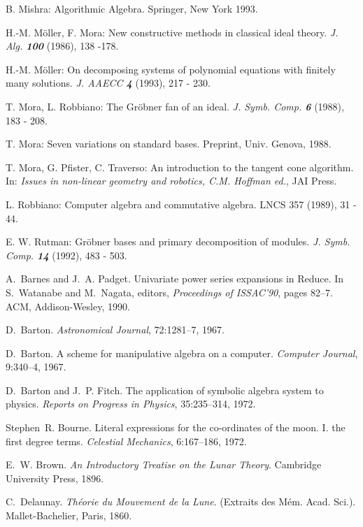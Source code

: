 \begin{thebibliography}{999}
 B. Mishra: Algorithmic Algebra. Springer, New York
1993.

 H.-M. M\"oller, F. Mora: New constructive methods in
classical ideal theory. \textit{J. Alg. \textbf{100}} (1986), 138 -178.

 H.-M. M\"oller: On decomposing systems of polynomial
equations with finitely many solutions. \emph{J. AAECC \textbf{4}} (1993),
217 - 230.  

 T. Mora, L. Robbiano: The Gr\"obner fan of an ideal.
\textit{J. Symb. Comp. \textbf{6}} (1988), 183 - 208.

 T. Mora: Seven variations on standard bases. 
Preprint, Univ. Genova, 1988.

 T. Mora, G. Pfister, C. Traverso: An introduction to
the tangent cone algorithm. In: \emph{Issues in non-linear geometry and 
robotics, C.M. Hoffman ed.}, JAI Press.

 L. Robbiano: Computer algebra and commutative algebra.
LNCS 357 (1989), 31 - 44.

 E. W. Rutman: Gr\"obner bases and primary decomposition of
modules. \textit{J. Symb. Comp. \textbf{14}} (1992), 483 - 503.



A.~Barnes and J.~A. Padget.
\newblock Univariate power series expansions in {Reduce}.
\newblock In S.~Watanabe and M.~Nagata, editors, \emph{Proceedings of ISSAC'90},
  pages 82--7. ACM, Addison-Wesley, 1990.

D.~Barton.
\newblock \emph{Astronomical Journal}, 72:1281--7, 1967.

D.~Barton.
\newblock A scheme for manipulative algebra on a computer.
\newblock \emph{Computer Journal}, 9:340--4, 1967.

D.~Barton and J.~P. Fitch.
\newblock The application of symbolic algebra system to physics.
\newblock \emph{Reports on Progress in Physics}, 35:235--314, 1972.

Stephen~R. Bourne.
\newblock Literal expressions for the co-ordinates of the moon. {I}. the first
  degree terms.
\newblock \emph{Celestial Mechanics}, 6:167--186, 1972.

E.~W. Brown.
\newblock \emph{An Introductory Treatise on the Lunar Theory}.
\newblock Cambridge University Press, 1896.

C.~Delaunay.
\newblock \emph{Th\'eorie du Mouvement de la Lune}.
\newblock (Extraits des M\'em. Acad. Sci.). Mallet-Bachelier, Paris, 1860.


\end{thebibliography}
